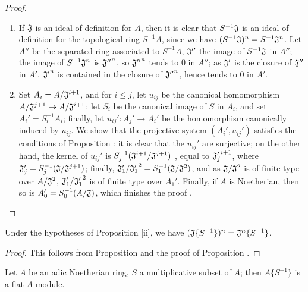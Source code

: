 \begin{proof}
\label{proof-7.6.11}
\medskip\noindent
\begin{enumerate}[label=(\roman*)]
  \item If $\mathfrak{J}$ is an ideal of definition for $A$, then it is clear that
    $S^{-1}\mathfrak{J}$ is an ideal of definition for the topological ring $S^{-1}A$, since we
    have $(S^{-1}\mathfrak{J})^n=S^{-1}\mathfrak{J}^n$. Let $A''$ be the separated ring associated
    to $S^{-1}A$, $\mathfrak{J}''$ the image of $S^{-1}\mathfrak{J}$ in $A''$; the image of
    $S^{-1}\mathfrak{J}^n$ is ${\mathfrak{J}''}^n$, so ${\mathfrak{J}''}^n$ tends to $0$ in $A''$;
    as $\mathfrak{J}'$ is the closure of $\mathfrak{J}''$ in $A'$, ${\mathfrak{J}'}^n$ is contained
    in the closure of ${\mathfrak{J}''}^n$, hence tends to $0$ in $A'$.
  \item Set $A_i=A/\mathfrak{J}^{i+1}$, and for $i\leqslant j$, let $u_{ij}$ be the canonical
    homomorphism $A/\mathfrak{J}^{j+1}\to A/\mathfrak{J}^{i+1}$; let $S_i$ be the canonical image of
    $S$ in $A_i$, and set $A_i'=S_i^{-1}A_i$; finally, let $u_{ij}':A_j'\to A_i'$ be the homomorphism
    canonically induced by $u_{ij}$. We show that the projective system $(A_i',u_{ij}')$ satisfies
    the conditions of Proposition : it is clear that the $u_{ij}'$
    are surjective; on the other hand, the kernel of $u_{ij}'$ is
    $S_j^{-1}(\mathfrak{J}^{i+1}/\mathfrak{J}^{j+1})$ , equal to
    ${\mathfrak{J}_j'}^{i+1}$, where $\mathfrak{J}_j'=S_j^{-1}(\mathfrak{J}/\mathfrak{J}^{j+1})$;
    finally, $\mathfrak{J}_1'/{\mathfrak{J}_1'}^2=S_1^{-1}(\mathfrak{J}/\mathfrak{J}^2)$, and as
    $\mathfrak{J}/\mathfrak{J}^2$ is of finite type over $A/\mathfrak{J}^2$,
    $\mathfrak{J}_1'/{\mathfrak{J}_1'}^2$ is of finite type over $A_1'$. Finally, if $A$ is
    Noetherian, then so is $A_0'=S_0^{-1}(A/\mathfrak{J})$, which finishes the proof .
\end{enumerate}
\end{proof}

\begin{cor}[7.6.12]
\label{0.7.6.12}
Under the hypotheses of Proposition [ii], we have
$(\mathfrak{J}\{S^{-1}\})^n=\mathfrak{J}^n\{S^{-1}\}$.
\end{cor}

\begin{proof}
\label{proof-0.7.6.12}
This follows from Proposition  and the proof of
Proposition .
\end{proof}

\begin{prop}[7.6.13]
\label{0.7.6.13}
Let $A$ be an adic Noetherian ring, $S$ a multiplicative subset of $A$; then $A\{S^{-1}\}$ is a
flat $A$-module.
\end{prop}

